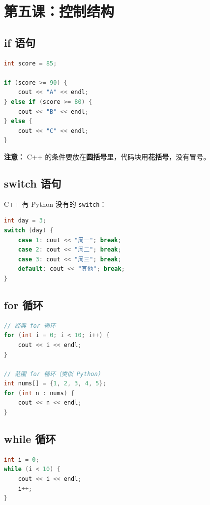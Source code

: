 \documentclass[a4paper,12pt]{ctexart}
\begin{document}
\section*{第五课：控制结构}

\subsection*{if 语句}

\begin{lstlisting}[language=C++]
int score = 85;

if (score >= 90) {
    cout << "A" << endl;
} else if (score >= 80) {
    cout << "B" << endl;
} else {
    cout << "C" << endl;
}
\end{lstlisting}

\textbf{注意：} C++ 的条件要放在\textbf{圆括号}里，代码块用\textbf{花括号}，没有冒号。

\subsection*{switch 语句}

C++ 有 Python 没有的 \texttt{switch}：

\begin{lstlisting}[language=C++]
int day = 3;
switch (day) {
    case 1: cout << "周一"; break;
    case 2: cout << "周二"; break;
    case 3: cout << "周三"; break;
    default: cout << "其他"; break;
}
\end{lstlisting}

\subsection*{for 循环}

\begin{lstlisting}[language=C++]
// 经典 for 循环
for (int i = 0; i < 10; i++) {
    cout << i << endl;
}

// 范围 for 循环（类似 Python）
int nums[] = {1, 2, 3, 4, 5};
for (int n : nums) {
    cout << n << endl;
}
\end{lstlisting}

\subsection*{while 循环}

\begin{lstlisting}[language=C++]
int i = 0;
while (i < 10) {
    cout << i << endl;
    i++;
}
\end{lstlisting}
\end{document}
